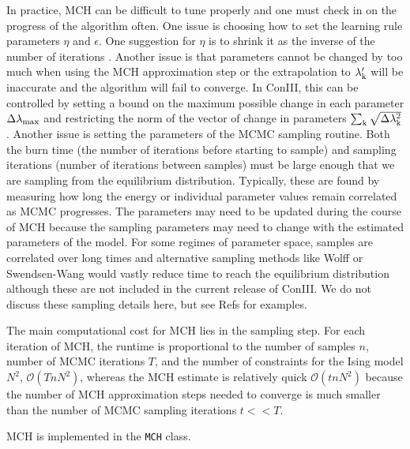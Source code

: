 \documentclass{jors}
\begin{document}
In practice, MCH can be difficult to tune properly and one must check in on the progress of the algorithm often. One issue is choosing how to set the learning rule parameters $\eta$ and $\epsilon$. One suggestion for $\eta$ is to shrink it as the inverse of the number of iterations \cite{Tkacik:2006vq}. Another issue is that parameters cannot be changed by too much when using the MCH approximation step or the extrapolation to $\lambda_{\rm k}'$ will be inaccurate and the algorithm will fail to converge. In ConIII, this can be controlled by setting a bound on the maximum possible change in each parameter  $\Delta\lambda_{\rm max}$ and restricting the norm of the vector of change in parameters $\sum_{\rm k} \sqrt{\Delta\lambda_{\rm k}^2}$. Another issue is setting the parameters of the MCMC sampling routine. Both the burn time (the number of iterations before starting to sample) and sampling iterations (number of iterations between samples) must be large enough that we are sampling from the equilibrium distribution.  Typically, these are found by measuring how long the energy or individual parameter values remain correlated as MCMC progresses. The parameters may need to be updated during the course of MCH because the sampling parameters may need to change with the estimated parameters of the model. For some regimes of parameter space, samples are correlated over long times and alternative sampling methods like Wolff or Swendsen-Wang would vastly reduce time to reach the equilibrium distribution although these are not included in the current release of ConIII. We do not discuss these sampling details here, but see Refs \cite{MacKay:2005wc,Newman:1999wu} for examples.

The main computational cost for MCH lies in the sampling step. For each iteration of MCH, the runtime is proportional to the number of samples $n$, number of MCMC iterations $T$, and the number of constraints for the Ising model $N^2$,
$\mathcal{O}(T n N^2)$, whereas the MCH estimate is relatively quick $\mathcal{O}(t n N^2)$ because the number of MCH approximation steps needed to converge is much smaller than the number of MCMC sampling iterations $t<<T$.

MCH is implemented in the {\tt MCH} class.
\end{document}
